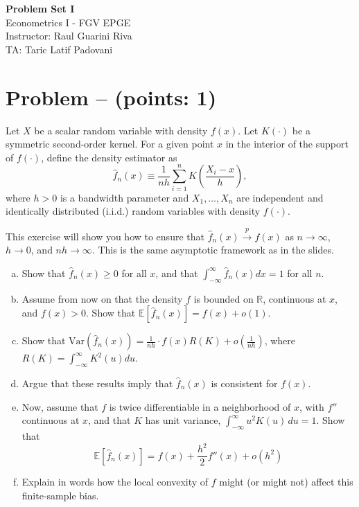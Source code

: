 \documentclass[11pt]{article}
\theoremstyle{definition}
\newcommand{\Var}{\mathrm{Var}}
\newcounter{problem}
\renewcommand{\theproblem}{\arabic{problem}}
\newcommand{\problem}[1]{
	\stepcounter{problem}
	\section*{Problem \theproblem{} -- (points: #1)}
}
\begin{document}
	\begin{center}
		{\LARGE{\textbf{Problem Set I}}}\\
		\vspace{0.2cm}
		Econometrics I - \textcolor{FGVBlue}{FGV EPGE}\\
		Instructor: Raul Guarini Riva \\
		TA: Taric Latif Padovani
	\end{center}

\problem{1}
Let $X$ be a scalar random variable with density $f(x)$. Let $K(\cdot)$ be a symmetric second-order kernel. For a given point $x$ in the interior of the support of $f(\cdot)$, define the density estimator as
\[\hat{f}_n(x) \equiv \frac{1}{nh} \sum_{i=1}^n K\left(\frac{X_i - x}{h}\right),\]
where \(h > 0\) is a bandwidth parameter and \(X_1, \ldots, X_n\) are independent and identically distributed (i.i.d.) random variables with density \(f(\cdot)\).

This exercise will show you how to ensure that $\hat{f}_n(x) \xrightarrow{p} f(x)$ as \(n \rightarrow \infty\), $h \rightarrow 0$, and $nh \rightarrow \infty$. This is the same asymptotic framework as in the slides.

\begin{enumerate}[a)]
	\item Show that $\hat{f}_n(x) \geq 0$ for all $x$, and that $\int_{-\infty}^{\infty} \hat{f}_n(x) dx = 1$ for all $n$.
	\item Assume from now on that the density $f$ is bounded on $\mathbb{R}$, continuous at $x$, and $f(x) > 0$. Show that $\mathbb{E}[\hat{f}_n(x)] = f(x) + o(1)$.
	\item Show that $\Var(\hat{f}_n(x)) = \frac{1}{nh}\cdot f(x)R(K) + o\left(\frac{1}{nh}\right)$, where \(R(K) = \int_{-\infty}^{\infty} K^2(u) du\).
	\item Argue that these results imply that $\hat{f}_n(x)$ is consistent for $f(x)$.
	\item Now, assume that $f$ is twice differentiable in a neighborhood of $x$, with $f''$ continuous at $x$, and that $K$ has unit variance, $\int_{-\infty}^{\infty} u^2 K(u)\, du = 1$. Show that
	\begin{equation*}
		\mathbb{E}[\hat{f}_n(x)] = f(x) + \frac{h^2}{2}f''(x) + o(h^2)
	\end{equation*}
	\item Explain in words how the local convexity of $f$ might (or might not) affect this finite-sample bias.
\end{enumerate}
\end{document}

